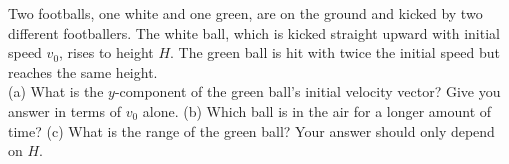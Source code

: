 Two footballs, one white and one green, are on the ground and kicked
by two different footballers. The white ball, which is kicked
straight upward with initial speed $v_0$, rises to height $H$. The green ball is
hit with twice the initial speed but reaches the same height.\\
%
(a) What is the $y$-component of the green ball's initial
velocity vector? Give you answer in terms of $v_0$ alone.\answercheck\hwendpart
%
(b) Which ball is in the air for a longer amount of time?\hwendpart
%
(c) What is the range of the green ball? Your answer should only
depend on $H$.\answercheck
